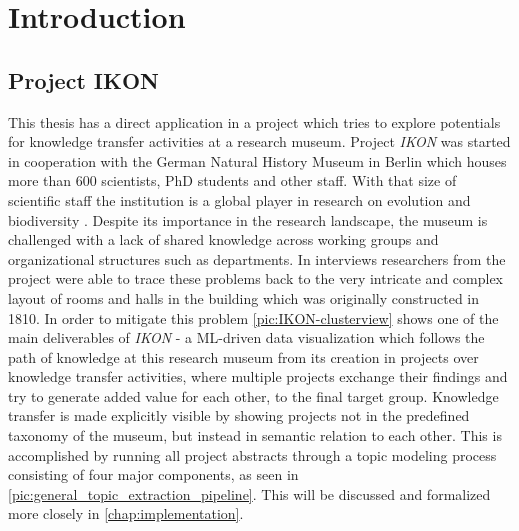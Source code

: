 %
\chapter{Introduction}
\label{chap:introduction}

\section{Project IKON}

This thesis has a direct application in a project which tries to explore potentials for knowledge transfer activities at a research museum. Project \textit{IKON} was started in cooperation with the German Natural History Museum in Berlin which houses more than 600  scientists, PhD students and other staff. With that size of scientific staff the institution is a global player in research on evolution and biodiversity \cite{IntroducingMuseumFur}. Despite its importance in the research landscape, the museum is challenged with a lack of shared knowledge across working groups and organizational structures such as departments. In interviews researchers from the project were able to trace these problems back to the very intricate and complex layout of rooms and halls in the building which was originally constructed in 1810. In order to mitigate this problem \autoref{pic:IKON-clusterview} shows one of the main deliverables of \textit{IKON} - a ML-driven data visualization which follows the path of knowledge at this research museum from its creation in projects over knowledge transfer activities, where multiple projects exchange their findings and try to generate added value for each other, to the final target group. Knowledge transfer is made explicitly visible by showing projects not in the predefined taxonomy of the museum, but instead in semantic relation to each other. This is accomplished by running all project abstracts through a topic modeling process consisting of four major components, as seen in \autoref{pic:general_topic_extraction_pipeline}. This will be discussed and formalized more closely in \autoref{chap:implementation}.

